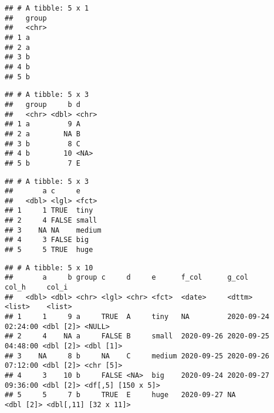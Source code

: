 \documentclass[
]{book}
\newenvironment{Shaded}{\begin{snugshade}}{\end{snugshade}}
\newcommand{\DecValTok}[1]{\textcolor[rgb]{0.00,0.00,0.81}{#1}}
\newcommand{\KeywordTok}[1]{\textcolor[rgb]{0.13,0.29,0.53}{\textbf{#1}}}
\newcommand{\NormalTok}[1]{#1}
\newcommand{\OperatorTok}[1]{\textcolor[rgb]{0.81,0.36,0.00}{\textbf{#1}}}
\newcommand{\StringTok}[1]{\textcolor[rgb]{0.31,0.60,0.02}{#1}}
\begin{document}
\begin{verbatim}
## # A tibble: 5 x 1
##   group
##   <chr>
## 1 a    
## 2 a    
## 3 b    
## 4 b    
## 5 b
\end{verbatim}

\begin{Shaded}
\end{Shaded}

\begin{verbatim}
## # A tibble: 5 x 3
##   group     b d    
##   <chr> <dbl> <chr>
## 1 a         9 A    
## 2 a        NA B    
## 3 b         8 C    
## 4 b        10 <NA> 
## 5 b         7 E
\end{verbatim}

\begin{Shaded}
\end{Shaded}

\begin{verbatim}
## # A tibble: 5 x 3
##       a c     e     
##   <dbl> <lgl> <fct> 
## 1     1 TRUE  tiny  
## 2     4 FALSE small 
## 3    NA NA    medium
## 4     3 FALSE big   
## 5     5 TRUE  huge
\end{verbatim}

\begin{Shaded}
\end{Shaded}

\begin{verbatim}
## # A tibble: 5 x 10
##       a     b group c     d     e      f_col      g_col               col_h     col_i               
##   <dbl> <dbl> <chr> <lgl> <chr> <fct>  <date>     <dttm>              <list>    <list>              
## 1     1     9 a     TRUE  A     tiny   NA         2020-09-24 02:24:00 <dbl [2]> <NULL>              
## 2     4    NA a     FALSE B     small  2020-09-26 2020-09-25 04:48:00 <dbl [2]> <dbl [1]>           
## 3    NA     8 b     NA    C     medium 2020-09-25 2020-09-26 07:12:00 <dbl [2]> <chr [5]>           
## 4     3    10 b     FALSE <NA>  big    2020-09-24 2020-09-27 09:36:00 <dbl [2]> <df[,5] [150 x 5]>  
## 5     5     7 b     TRUE  E     huge   2020-09-27 NA                  <dbl [2]> <dbl[,11] [32 x 11]>
\end{verbatim}
\end{document}
